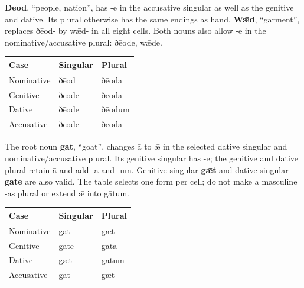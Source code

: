 \textbf{Ðēod}, “people, nation”, has -e in the accusative singular as well as the genitive and dative. Its plural otherwise has the same endings as hand. \textbf{Wǣd}, “garment”, replaces ðēod- by wǣd- in all eight cells. Both nouns also allow -e in the nominative/\allowbreak{}accusative plural: ðēode, wǣde.

\par\begingroup
\fontsize{10.5}{13.2}\selectfont
\setlength{\LTleft}{0pt}\setlength{\LTright}{\fill}
\noindent
\begin{tabular}{@{}>{\raggedright\arraybackslash}p{39.46mm}>{\raggedright\arraybackslash}p{39.46mm}>{\raggedright\arraybackslash}p{39.46mm}@{}}
\toprule
\textbf{Case} & \textbf{Singular} & \textbf{Plural} \\
\midrule
Nominative & ðēod & ðēoda \\
Genitive & ðēode & ðēoda \\
Dative & ðēode & ðēodum \\
Accusative & ðēode & ðēoda \\
\bottomrule
\end{tabular}
\par\endgroup

The root noun \textbf{gāt}, “goat”, changes ā to ǣ in the selected dative singular and nominative/\allowbreak{}accusative plural. Its genitive singular has -e; the genitive and dative plural retain ā and add -a and -um. Genitive singular \textbf{gǣt} and dative singular \textbf{gāte} are also valid. The table selects one form per cell; do not make a masculine -as plural or extend ǣ into gātum.

\par\begingroup
\fontsize{10.5}{13.2}\selectfont
\setlength{\LTleft}{0pt}\setlength{\LTright}{\fill}
\noindent
\begin{tabular}{@{}>{\raggedright\arraybackslash}p{39.46mm}>{\raggedright\arraybackslash}p{39.46mm}>{\raggedright\arraybackslash}p{39.46mm}@{}}
\toprule
\textbf{Case} & \textbf{Singular} & \textbf{Plural} \\
\midrule
Nominative & gāt & gǣt \\
Genitive & gāte & gāta \\
Dative & gǣt & gātum \\
Accusative & gāt & gǣt \\
\bottomrule
\end{tabular}
\par\endgroup

